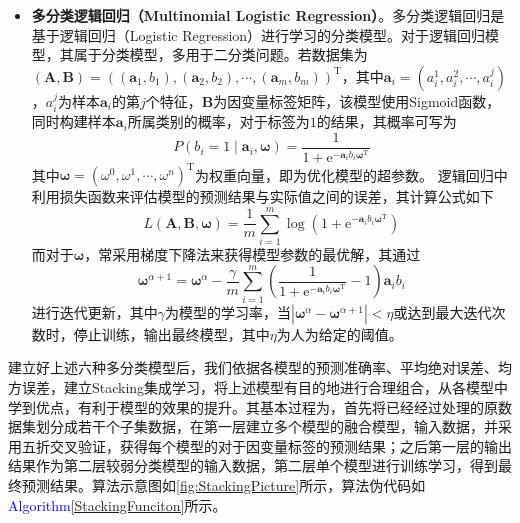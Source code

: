 \documentclass{MathorCupmodeling}
\begin{document}
\begin{itemize}
		\item \textbf{多分类逻辑回归（Multinomial Logistic Regression）}。多分类逻辑回归是基于逻辑回归（Logistic Regression）进行学习的分类模型。对于逻辑回归模型，其属于分类模型，多用于二分类问题。若数据集为$\left(\boldsymbol{A},\boldsymbol{B}\right)=\left(\left(\boldsymbol{a}_1,b_1\right),\left(\boldsymbol{a}_2,b_2\right),\cdots,\left(\boldsymbol{a}_m,b_m\right)\right)^{\mathrm{T}}$，其中$\boldsymbol{a}_i=\left(a_i^1,a_i^2,\cdots,a_i^j\right)$，$a_i^j$为样本$\boldsymbol{a}_i$的第$j$个特征，$\boldsymbol{B}$为因变量标签矩阵，该模型使用Sigmoid函数，同时构建样本$\boldsymbol{a}_i$所属类别的概率，对于标签为$1$的结果，其概率可写为
		\begin{equation}
			P\left(b_i=1\mid \boldsymbol{a}_i,\boldsymbol{\omega}\right)=\frac{1}{1+\mathrm{e}^{-\boldsymbol{a}_ib_i\boldsymbol{\omega}^\mathrm{T}}} \label{fLRp}
		\end{equation}
		其中$\boldsymbol{\omega}=\left(\omega^0,\omega^1,\cdots,\omega^n\right)^\mathrm{T}$为权重向量，即为优化模型的超参数。
		逻辑回归中利用损失函数来评估模型的预测结果与实际值之间的误差，其计算公式如下
		\begin{equation}
			L\left(\boldsymbol{A},\boldsymbol{B},\boldsymbol{\omega}\right)=\frac{1}{m}\sum\limits_{i=1}^{m}\log \left(1+\mathrm{e}^{-\boldsymbol{a}_ib_i \boldsymbol{\omega}^{\mathrm{T}}}\right) \label{fLRl}
		\end{equation}
		而对于$\boldsymbol{\omega}$，常采用梯度下降法来获得模型参数的最优解，其通过
		\begin{equation}
			\boldsymbol{\omega}^{\alpha+1}=\boldsymbol{\omega}^\alpha-\frac{\gamma}{m}\sum\limits_{i=1}^{m}\left(\frac{1}{1+\mathrm{e}^{-\boldsymbol{a}_ib_i \boldsymbol{\omega}^{\mathrm{T}}}}-1\right)\boldsymbol{a}_ib_i \label{fLRw}
		\end{equation}
		进行迭代更新，其中$\gamma$为模型的学习率，当$\left|  \boldsymbol{\omega}^{\alpha}-\boldsymbol{\omega}^{\alpha+1} \right|<\eta$或达到最大迭代次数时，停止训练，输出最终模型，其中$\eta$为人为给定的阈值\textcolor{blue}{\cite{plr}}。
	\end{itemize}

	建立好上述六种多分类模型后，我们依据各模型的预测准确率、平均绝对误差、均方误差，建立Stacking集成学习，将上述模型有目的地进行合理组合，从各模型中学到优点，有利于模型的效果的提升。其基本过程为，首先将已经经过处理的原数据集划分成若干个子集数据，在第一层建立多个模型的融合模型，输入数据，并采用五折交叉验证，获得每个模型的对于因变量标签的预测结果；之后第一层的输出结果作为第二层较弱分类模型的输入数据，第二层单个模型进行训练学习，得到最终预测结果\textcolor{blue}{\cite{pstacking}}。算法示意图如\textcolor{blue}{\cref{fig:StackingPicture}}所示，算法伪代码如\textcolor{blue}{Algorithm\ref{StackingFunciton}}所示。
\end{document}
